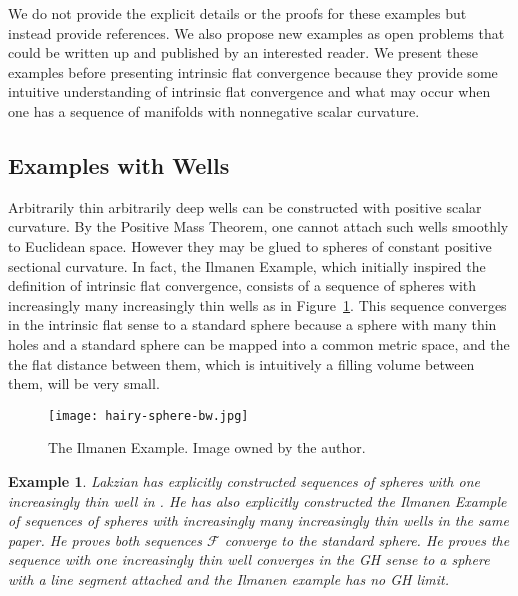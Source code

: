 \documentclass[12pt]{amsart}
\newtheorem{example}[thm]{Example}
\begin{document}
We do not provide the explicit details or the proofs for these examples
but instead provide references.   We also propose new examples
as open problems that could be written up and published by an interested reader.
We present these examples before presenting intrinsic flat convergence
because they provide some intuitive understanding of intrinsic flat
convergence and what may occur when one has a sequence of
manifolds with nonnegative scalar curvature.   

\subsection{Examples with Wells}

Arbitrarily thin arbitrarily deep wells can be constructed 
with positive scalar curvature.  By the Positive Mass 
Theorem, one cannot attach such wells smoothly to Euclidean space.
However they may be glued to spheres of constant positive sectional 
curvature.   In fact, the Ilmanen Example, which initially inspired the
definition of intrinsic flat convergence, consists of a sequence of 
spheres with increasingly many increasingly thin wells as in Figure~\ref{fig-Ilmanen}.   This sequence converges in the intrinsic
flat sense to a standard sphere because a sphere with many thin holes and
a standard sphere can be mapped into a common metric space, and the
the flat distance between them, which is intuitively a filling volume between them,
will be very small.

\begin{figure}[htbp]
\begin{center}
\texttt{[image: hairy-sphere-bw.jpg]}
\caption{The Ilmanen Example.   Image owned by the author.}
\label{fig-Ilmanen}
\end{center}
\end{figure}

\begin{example} \label{well-sphere}
Lakzian has explicitly
constructed sequences of spheres with one increasingly thin well in 
\cite{Lakzian-Diameter}.  He has also
explicitly constructed the Ilmanen Example of sequences of spheres with
increasingly many increasingly thin wells in the same paper.  He proves
both sequences $\mathcal{F}$ converge to the standard sphere.
He proves the sequence with one increasingly
thin well converges in the GH sense to a sphere with a line segment
attached and the Ilmanen example has no GH limit.
\end{example}
\end{document}
